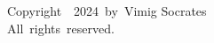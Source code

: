 \vspace*{3in}
\begin{singlespace}
	\begin{center}
		Copyright~\textcopyright{}~2024~by~Vimig Socrates\\
		All~rights~reserved.
	\end{center}
\end{singlespace}